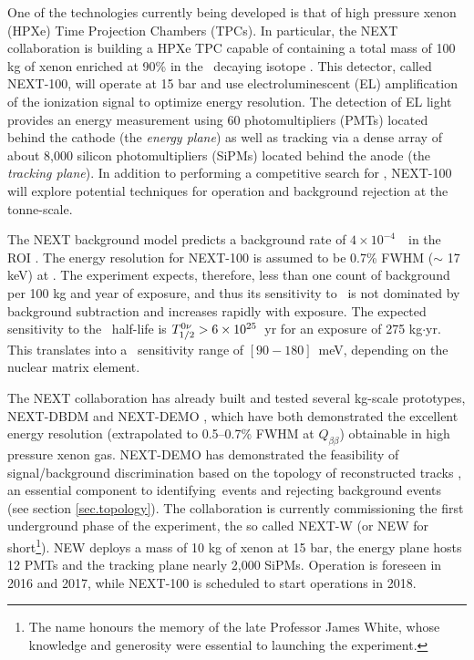 \documentclass[a4paper,11pt]{article}
\begin{document}
One of the technologies currently being developed is that of high pressure xenon (HPXe) Time Projection Chambers (TPCs). In particular, the NEXT collaboration is building a HPXe TPC capable of 
containing a total mass of 100 kg of xenon enriched at 90\% in the \bb\ decaying isotope \XE \cite{NEXT_sensitivity}. This detector, called NEXT-100, will operate at 15 bar and use electroluminescent 
(EL) amplification of the ionization signal to optimize energy resolution. The detection of EL light provides an energy measurement using 60 photomultipliers (PMTs) located behind the cathode 
(the \emph{energy plane}) as well as 
tracking via a dense array of about 8,000 silicon photomultipliers (SiPMs) located behind the anode (the \emph{tracking plane}).
In addition to performing a competitive search for \bbonu, NEXT-100 will explore potential techniques for operation and background rejection at the tonne-scale.  

The NEXT background model predicts a background rate of $4 \times 10^{-4}$~\ckky\ in the ROI  \cite{NEXT_sensitivity}. The energy resolution for NEXT-100 is assumed to be 0.7\% FWHM ($\sim$ 17 keV) at \Qbb. The experiment expects, therefore, less than one count of background per 100 kg and year of exposure, and thus its sensitivity to \Tonu\ is not dominated by background subtraction and increases rapidly with exposure. The expected sensitivity to the \bbonu\ half-life is $T_{1/2}^{0\nu} > 6 \times 10^{25}$~yr for an exposure of 275 kg$\cdot$yr. This translates into a \mbb\ sensitivity range of $[90-180]$~meV, depending on the nuclear matrix element.

The NEXT collaboration has already built and tested several kg-scale prototypes, NEXT-DBDM \cite{Alvarez:2012kua} and
NEXT-DEMO \cite{Alvarez:2012xda,Alvarez:2013gxa,Lorca:2014sra}, which have both demonstrated the excellent energy resolution (extrapolated to 0.5--0.7\% FWHM at
$Q_{\beta\beta}$) obtainable in high pressure xenon gas.  NEXT-DEMO has demonstrated the feasibility of signal/background discrimination based on the topology of reconstructed tracks \cite{NEXT_topology},
an essential component to identifying \bbonu\,events and rejecting background events (see section \ref{sec.topology}).  The collaboration is currently commissioning the first underground phase of the experiment, the so called NEXT-W{} (or NEW for short\footnote{The name honours the memory of the late Professor James White, whose knowledge and generosity were essential to launching the experiment.}). NEW deploys a  mass of 10 kg of xenon at 15 bar, the energy plane hosts 12 PMTs and the tracking plane nearly 2,000 SiPMs. Operation is foreseen in 2016 and 2017, while NEXT-100 is scheduled to start operations in 2018.
\end{document}
